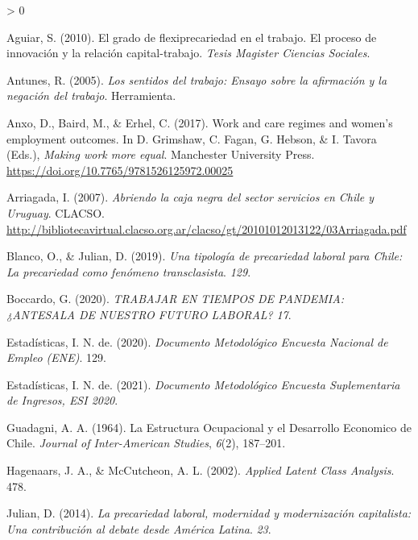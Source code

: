 \documentclass[
]{article}
\newlength{\cslhangindent}
\newenvironment{CSLReferences}[2] %
 {%
  \setlength{\parindent}{0pt}
  \ifodd #1 \everypar{\setlength{\hangindent}{\cslhangindent}}\ignorespaces\fi
  \ifnum #2 > 0
  \setlength{\parskip}{#2\baselineskip}
  \fi
 }%
 {}
\begin{document}
\hypertarget{refs}{}
\begin{CSLReferences}{1}{0}
\leavevmode\hypertarget{ref-aguiar2010}{}%
Aguiar, S. (2010). El grado de flexiprecariedad en el trabajo. {El}
proceso de innovación y la relación capital-trabajo. \emph{Tesis
Magister Ciencias Sociales}.

\leavevmode\hypertarget{ref-antunes2005}{}%
Antunes, R. (2005). \emph{Los sentidos del trabajo: Ensayo sobre la
afirmación y la negación del trabajo}. Herramienta.

\leavevmode\hypertarget{ref-anxo2017}{}%
Anxo, D., Baird, M., \& Erhel, C. (2017). Work and care regimes and
women's employment outcomes. In D. Grimshaw, C. Fagan, G. Hebson, \& I.
Tavora (Eds.), \emph{Making work more equal}. Manchester University
Press. \url{https://doi.org/10.7765/9781526125972.00025}

\leavevmode\hypertarget{ref-arriagada2007}{}%
Arriagada, I. (2007). \emph{Abriendo la caja negra del sector servicios
en {Chile} y {Uruguay}}. CLACSO.
\url{http://bibliotecavirtual.clacso.org.ar/clacso/gt/20101012013122/03Arriagada.pdf}

\leavevmode\hypertarget{ref-blanco2019}{}%
Blanco, O., \& Julian, D. (2019). \emph{Una tipología de precariedad
laboral para {Chile}: La precariedad como fenómeno transclasista}.
\emph{129}.

\leavevmode\hypertarget{ref-boccardo2020}{}%
Boccardo, G. (2020). \emph{{TRABAJAR} {EN} {TIEMPOS} {DE} {PANDEMIA}:
¿{ANTESALA} {DE} {NUESTRO} {FUTURO} {LABORAL}?} \emph{17}.

\leavevmode\hypertarget{ref-instituonacionaldeestadisticas2020}{}%
Estadísticas, I. N. de. (2020). \emph{Documento {Metodológico}
{Encuesta} {Nacional} de {Empleo} ({ENE})}. 129.

\leavevmode\hypertarget{ref-instituonacionaldeestadisticas2021}{}%
Estadísticas, I. N. de. (2021). \emph{Documento {Metodológico}
{Encuesta} {Suplementaria} de {Ingresos}, {ESI} 2020}.

\leavevmode\hypertarget{ref-guadagni1964}{}%
Guadagni, A. A. (1964). La {Estructura} {Ocupacional} y el {Desarrollo}
{Economico} de {Chile}. \emph{Journal of Inter-American Studies},
\emph{6}(2), 187--201.

\leavevmode\hypertarget{ref-hagenaars2002}{}%
Hagenaars, J. A., \& McCutcheon, A. L. (2002). \emph{Applied {Latent}
{Class} {Analysis}}. 478.

\leavevmode\hypertarget{ref-julian2014}{}%
Julian, D. (2014). \emph{La precariedad laboral, modernidad y
modernización capitalista: {Una} contribución al debate desde {América}
{Latina}}. \emph{23}.


\end{CSLReferences}
\end{document}
